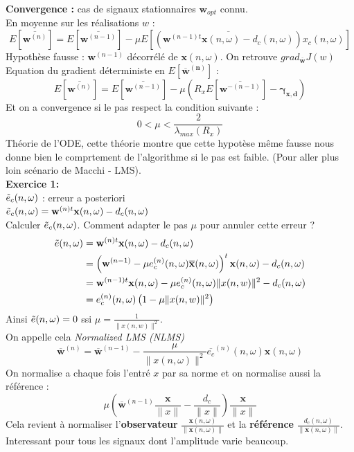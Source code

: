 \documentclass[12pt]{article}
\begin{document}
\textbf{Convergence :} cas de signaux stationnaires $\mathbf{w}_{opt}$ connu.\\
En moyenne sur les réalisations $w$ : $$E[\overline{\mathbf{w}^{(n)}}] = E[\overline{\mathbf{w}^{(n-1)}}] - \mu E[(\overline{\mathbf{w}^{(n-1)t}\mathbf{x}(n,\omega) - d_c(n,\omega)})x_c(n,\omega)]  $$
Hypothèse fausse : $\mathbf{w}^{(n-1)}$ décorrélé de $\mathbf{x}(n,\omega)$. On retrouve $grad_\mathbf{\overline{w}} J(w)$
\\
Equation du gradient déterministe en $E[\mathbf{\overline{w}^{(n)}}]$ :
$$E[\overline{\mathbf{w}^{(n)}}] = E[\overline{\mathbf{w}^{(n-1)}}] - \mu \left(R_x E[\overline{\mathbf{w}^{-(n-1)}}]- \mathbf{\gamma_{x,d}}\right) $$
Et on a convergence si le pas respect la condition suivante : 
$$0<\mu<\frac{2}{\lambda_{max}(R_x)}$$
Théorie de l'ODE, cette théorie montre que cette hypotèse même fausse nous donne bien le comprtement de l'algorithme si le pas est faible. (Pour aller plus loin scénario de Macchi - LMS).\\

\textbf{Exercice 1:}\\
$\Tilde{e}_c(n,\omega)$ : erreur a posteriori\\
$\Tilde{e}_c(n,\omega) = \mathbf{w}^{(n)t}\mathbf{x}(n,\omega) - d_c(n,\omega)$\\
Calculer $\Tilde{e}_c(n,\omega)$. Comment adapter le pas $\mu$ pour annuler cette erreur ?\\
\begin{align}
    \Tilde{e}(n,\omega) &= \mathbf{w}^{(n)t}\mathbf{x}(n,\omega) - d_c(n,\omega) \nonumber \\
    &= \left( \mathbf{w}^{(n-1)} - \mu e_c^{(n)}(n,\omega) \overline{\mathbf{x}}(n,\omega) \right)^t \mathbf{x}(n,\omega) - d_c(n,\omega) \nonumber \\
    &= \mathbf{w}^{(n-1)t} \mathbf{x}(n,\omega) - \mu  e_c^{(n)}(n,\omega) \| x(n,w) \|^2 -  d_c(n,\omega) \nonumber \\
    &= e_c^{(n)}(n,\omega) \left( 1- \mu \| x(n,w) \|^2 \right)
\end{align}
Ainsi $\Tilde{e}(n,\omega)=0 $ ssi $\mu = \frac{1}{\| x(n,w) \|^2}$. \\
On appelle cela \textit{Normalized LMS (NLMS)} \\
$$\overline{\mathbf{w}}^{(n)} = \overline{\mathbf{w}}^{(n-1)} - \frac{\mu}{\| x(n,\omega) \|^2} \overline{e_c}^{(n)}(n,\omega) \mathbf{x}(n,\omega) $$
On normalise a chaque fois l'entré $x$ par sa norme et on normalise aussi la référence :
$$\mu \left( \overline{\mathbf{w}}^{(n-1)} \frac{\mathbf{x}}{\|x\|} - \frac{d_c}{\|x\|}\right) \frac{\mathbf{x}}{\|x\|}$$
Cela revient à normaliser l'\textbf{observateur} $\frac{\mathbf{x}(n,\omega)}{\|\mathbf{x}(n,\omega)\|}$ et la \textbf{référence} $\frac{d_c(n,\omega)}{\|\mathbf{x}(n,\omega)\|}$.\\
Interessant pour tous les signaux dont l'amplitude varie beaucoup.\\
\end{document}
